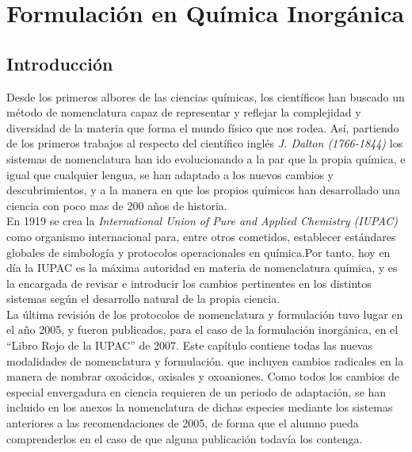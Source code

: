 \chapter{Formulación en Química Inorgánica}

\section{Introducción}
Desde los primeros albores de las ciencias químicas, los científicos han buscado un método de nomenclatura capaz de representar y reflejar la complejidad y diversidad de la materia que forma el mundo físico que nos rodea. Así, partiendo de los primeros trabajos al respecto del científico inglés \emph{J. Dalton (1766-1844)} los sistemas de nomenclatura han ido evolucionando a la par que la propia química, e igual que cualquier lengua, se han adaptado a los nuevos cambios y descubrimientos, y a la manera en que los propios químicos han desarrollado una ciencia con poco mas de 200 años de historia.\\
En 1919 se crea la \emph{International Union of Pure and Applied Chemistry (IUPAC)} como organismo internacional para, entre otros cometidos, establecer estándares globales de simbología y protocolos operacionales en química.Por tanto, hoy en día la IUPAC es la máxima autoridad en materia de nomenclatura química, y es la encargada de revisar e introducir los cambios pertinentes en los distintos sistemas según el desarrollo natural de la propia ciencia.\\

La última revisión de los protocolos de nomenclatura y formulación tuvo lugar en el año 2005, y fueron publicados, para el caso de la formulación inorgánica, en el “Libro Rojo de la IUPAC” de 2007. Este capítulo contiene todas las nuevas modalidades de nomenclatura y formulación. que incluyen cambios radicales en la manera de nombrar oxoácidos, oxisales y oxoaniones. Como todos los cambios de especial envergadura en ciencia requieren de un periodo de adaptación, se han incluido en los anexos la nomenclatura de dichas especies mediante los sistemas anteriores a las recomendaciones de 2005, de forma que el alumno pueda comprenderlos en el caso de que alguna publicación todavía los contenga.

